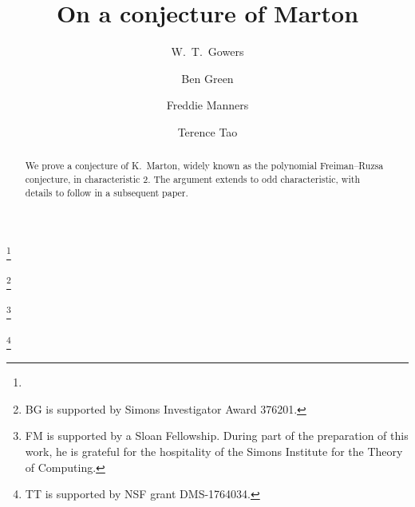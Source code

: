 \documentclass[12pt,reqno,tbtags]{amsart}
\theoremstyle{definition}
\theoremstyle{remark}
\numberwithin{equation}{section}
\begin{document}
\title[On a conjecture of Marton]{On a conjecture of Marton}



\author{W.~T.~Gowers}
\thanks{}
\address{Coll\`ege de France \\
11, place Marcelin-Berthelot \\
75231 Paris 05 \\
France \\
and Centre for Mathematical Sciences \\
Wilberforce Road \\
Cambridge CB3 0WB \\
UK}

\author{Ben Green}
\thanks{BG is supported by Simons Investigator Award 376201.}
\address{Mathematical Institute \\
Andrew Wiles Building \\
Radcliffe Observatory Quarter \\
Woodstock Rd \\
Oxford OX2 6QW \\
UK}

\author{Freddie Manners}
\thanks{FM is supported by a Sloan Fellowship.  During part of the preparation of this work, he is grateful for the hospitality of the Simons Institute for the Theory of Computing.}
\address{Department of Mathematics \\
University of California, San Diego (UCSD)\\
9500 Gilman Drive \# 0112 \\
La Jolla, CA  92093-0112 \\ %
USA}

\author{Terence Tao}
\thanks{TT is supported by NSF grant DMS-1764034.  }
\address{Math Sciences Building \\
520 Portola Plaza \\
Box 951555 \\
Los Angeles, CA 90095 \\
USA}





\begin{abstract}
We prove a conjecture of K.~Marton, widely known as the polynomial Freiman--Ruzsa conjecture, in characteristic $2$. The argument extends to odd characteristic, with details to follow in a subsequent paper.
\end{abstract}
\end{document}
